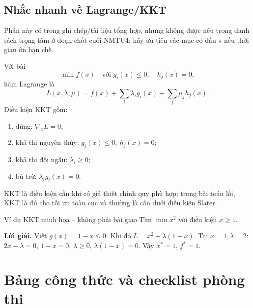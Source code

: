 \documentclass[11pt,a4paper]{article}
\newcommand{\grad}{\nabla}
\begin{document}
\clearpage
\subsection{Nhắc nhanh về Lagrange/KKT}
Phần này có trong ghi chép/tài liệu tổng hợp, nhưng không được nêu trong danh sách trọng tâm ở đoạn chốt cuối NMTU4; hãy ưu tiên các mục có dấu \(\star\) nếu thời gian ôn hạn chế.

Với bài
\[
\min f(x)\quad\text{với }g_i(x)\le0,\quad h_j(x)=0,
\]
hàm Lagrange là
\[
L(x,\lambda,\mu)=f(x)+\sum_i\lambda_i g_i(x)+\sum_j\mu_j h_j(x).
\]
Điều kiện KKT gồm:
\begingroup
\small
\begin{enumerate}[nosep,leftmargin=*]
\item dừng: \(\grad_x L=0\);
\item khả thi nguyên thủy: \(g_i(x)\le0,\ h_j(x)=0\);
\item khả thi đối ngẫu: \(\lambda_i\ge0\);
\item bù trừ: \(\lambda_i g_i(x)=0\).
\end{enumerate}
KKT là điều kiện cần khi có giả thiết chính quy phù hợp; trong bài toán lồi, KKT là đủ cho tối ưu toàn cục và thường là cần dưới điều kiện Slater.

\begin{questionbox}{Ví dụ KKT minh họa -- không phải bài giao}
Tìm \(\min x^2\) với điều kiện \(x\ge1\).
\end{questionbox}
\textbf{Lời giải.} Viết \(g(x)=1-x\le0\). Khi đó \(L=x^2+\lambda(1-x)\). Tại \(x=1,\lambda=2\): \(2x-\lambda=0\), \(1-x=0\), \(\lambda\ge0\), \(\lambda(1-x)=0\). Vậy \(x^\ast=1\), \(f^\ast=1\).

\section{Bảng công thức và checklist phòng thi}
\end{document}
